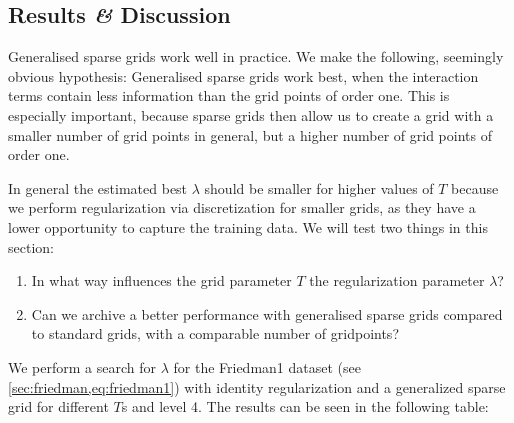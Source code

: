 \subsection{Results \textit{\&} Discussion}
Generalised sparse grids work well in practice.
We make the following, seemingly obvious hypothesis:
Generalised sparse grids work best, when the interaction terms contain less
information than the grid points of order one.
This is especially important, because sparse grids then allow us to create a
grid with a smaller number of grid points in general, but a higher number of
grid points of order one.

In general the estimated best \(\lambda\) should be smaller for higher values of \(T\) because we perform regularization via discretization for smaller grids, as they have a lower opportunity to capture the training data.
We will test two things in this section:
\begin{enumerate}
\item In what way influences the grid parameter \(T\) the regularization
  parameter \(\lambda\)?
\item Can we archive a better performance with generalised sparse grids compared
  to standard grids, with a comparable number of gridpoints?
\end{enumerate}

We perform a search for \(\lambda\) for the Friedman1 dataset (see \cref{sec:friedman,eq:friedman1}) with identity regularization and a generalized sparse grid for different \(T\)s and level 4.
The results can be seen in the following table:

